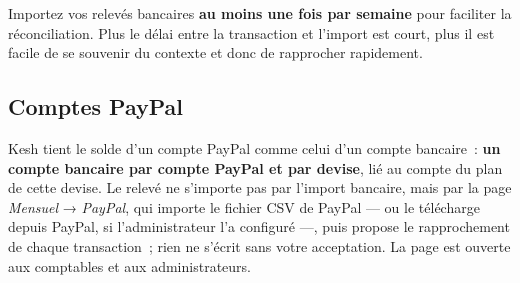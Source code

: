 \documentclass[a4paper,11pt,oneside]{article}
\begin{document}
\begin{keshtip}
Importez vos relevés bancaires \textbf{au moins une fois par semaine} pour faciliter la réconciliation. Plus le délai entre la transaction et l'import est court, plus il est facile de se souvenir du contexte et donc de rapprocher rapidement.
\end{keshtip}

\subsection{Comptes PayPal}\label{sec:comptes-paypal}

Kesh tient le solde d'un compte PayPal comme celui d'un compte bancaire~: \textbf{un compte bancaire par compte PayPal et par devise}, lié au compte du plan de cette devise. Le relevé ne s'importe pas par l'import bancaire, mais par la page \emph{Mensuel} → \emph{PayPal}, qui importe le fichier CSV de PayPal --- ou le télécharge depuis PayPal, si l'administrateur l'a configuré ---, puis propose le rapprochement de chaque transaction~; rien ne s'écrit sans votre acceptation. La page est ouverte aux comptables et aux administrateurs.
\end{document}
